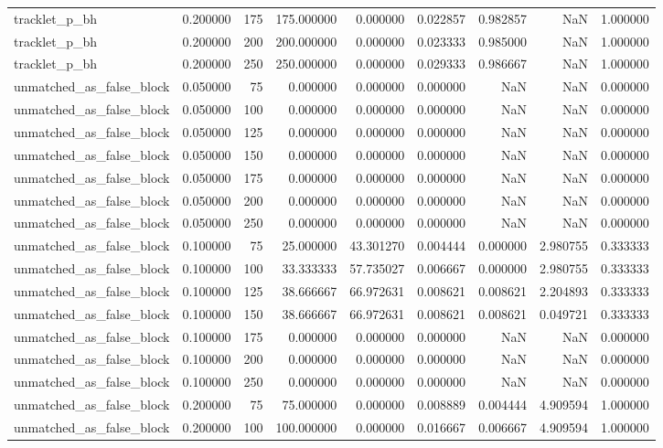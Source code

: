 \begin{tabular}{lrrrrrrrr}
tracklet_p_bh & 0.200000 & 175 & 175.000000 & 0.000000 & 0.022857 & 0.982857 & NaN & 1.000000 \\
tracklet_p_bh & 0.200000 & 200 & 200.000000 & 0.000000 & 0.023333 & 0.985000 & NaN & 1.000000 \\
tracklet_p_bh & 0.200000 & 250 & 250.000000 & 0.000000 & 0.029333 & 0.986667 & NaN & 1.000000 \\
unmatched_as_false_block & 0.050000 & 75 & 0.000000 & 0.000000 & 0.000000 & NaN & NaN & 0.000000 \\
unmatched_as_false_block & 0.050000 & 100 & 0.000000 & 0.000000 & 0.000000 & NaN & NaN & 0.000000 \\
unmatched_as_false_block & 0.050000 & 125 & 0.000000 & 0.000000 & 0.000000 & NaN & NaN & 0.000000 \\
unmatched_as_false_block & 0.050000 & 150 & 0.000000 & 0.000000 & 0.000000 & NaN & NaN & 0.000000 \\
unmatched_as_false_block & 0.050000 & 175 & 0.000000 & 0.000000 & 0.000000 & NaN & NaN & 0.000000 \\
unmatched_as_false_block & 0.050000 & 200 & 0.000000 & 0.000000 & 0.000000 & NaN & NaN & 0.000000 \\
unmatched_as_false_block & 0.050000 & 250 & 0.000000 & 0.000000 & 0.000000 & NaN & NaN & 0.000000 \\
unmatched_as_false_block & 0.100000 & 75 & 25.000000 & 43.301270 & 0.004444 & 0.000000 & 2.980755 & 0.333333 \\
unmatched_as_false_block & 0.100000 & 100 & 33.333333 & 57.735027 & 0.006667 & 0.000000 & 2.980755 & 0.333333 \\
unmatched_as_false_block & 0.100000 & 125 & 38.666667 & 66.972631 & 0.008621 & 0.008621 & 2.204893 & 0.333333 \\
unmatched_as_false_block & 0.100000 & 150 & 38.666667 & 66.972631 & 0.008621 & 0.008621 & 0.049721 & 0.333333 \\
unmatched_as_false_block & 0.100000 & 175 & 0.000000 & 0.000000 & 0.000000 & NaN & NaN & 0.000000 \\
unmatched_as_false_block & 0.100000 & 200 & 0.000000 & 0.000000 & 0.000000 & NaN & NaN & 0.000000 \\
unmatched_as_false_block & 0.100000 & 250 & 0.000000 & 0.000000 & 0.000000 & NaN & NaN & 0.000000 \\
unmatched_as_false_block & 0.200000 & 75 & 75.000000 & 0.000000 & 0.008889 & 0.004444 & 4.909594 & 1.000000 \\
unmatched_as_false_block & 0.200000 & 100 & 100.000000 & 0.000000 & 0.016667 & 0.006667 & 4.909594 & 1.000000 \\

\end{tabular}
